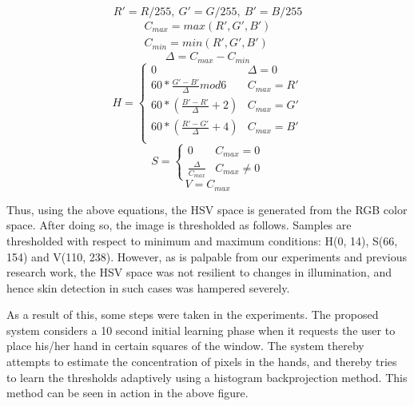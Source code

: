 \documentclass[letterpaper, 10 pt, twoside, conference]{ieeeconf}
\begin{document}
\begin{equation}
  \label{eq:1}
  R' = R/255,\ G' = G/255,\ B' = B/255
\end{equation}
\begin{equation}
  \begin{multlined}
C_{max} = max(R', G', B')\\
C_{min} = min(R', G', B')
  \end{multlined}
\end{equation}
\begin{equation}
  \Delta = C_{max} - C_{min}
\end{equation}
\begin{equation}
   H = \begin{cases} 
            0 & \Delta = 0 \\
   60 * \frac{G'-B'}{\Delta}mod6 & C_{max} = R' \\
     60 * (\frac{B'-R'}{\Delta}+2) & C_{max}=G' \\
     60 * (\frac{R'-G'}{\Delta}+4) & C_{max} = B'\\

         \end{cases}
\end{equation}
\begin{equation}
  S = \begin{cases}
      0 & C_{max} = 0\\
      \frac{\Delta}{C_{max}} & C_{max} \neq 0
  \end{cases}
\end{equation}
\begin{equation}
  V = C_{max}
\end{equation}

Thus, using the above equations, the HSV space is generated from the RGB color space.
After doing so, the image is thresholded as follows. Samples are thresholded with respect
to minimum and maximum conditions: H(0, 14), S(66, 154) and V(110, 238).
However, as is palpable from our experiments and previous research work, the HSV space
was not resilient to changes in illumination, and hence skin detection in such cases
was hampered severely.

As a result of this, some steps were taken in the experiments. The proposed system considers
a 10 second initial learning phase when it requests the user to place his/her hand in certain
squares of the window. The system thereby attempts to estimate the concentration of pixels in the
hands, and thereby tries to learn the thresholds adaptively using a histogram backprojection method.
This method can be seen in action in the above figure. 
\end{document}
